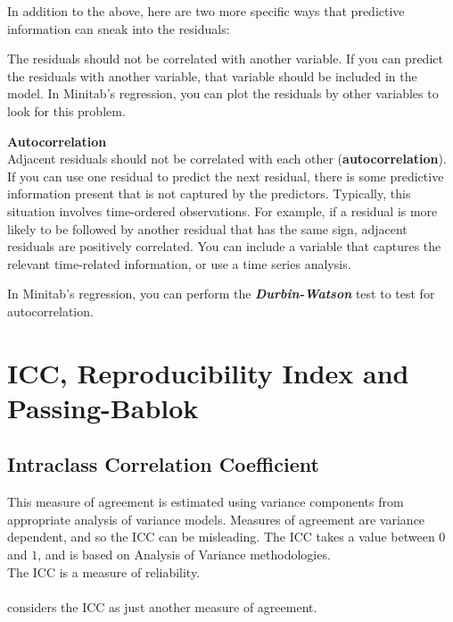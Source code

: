\documentclass[12pt, a4paper]{report}
\theoremstyle{plain}
\theoremstyle{definition}
\theoremstyle{remark}
\begin{document}
	In addition to the above, here are two more specific ways that predictive information can sneak into the residuals:
	
	The residuals should not be correlated with another variable. If you can predict the residuals with another variable, that variable should be included in the model. In Minitab’s regression, you can plot the residuals by other variables to look for this problem.
	
	\noindent \textbf{Autocorrelation} \\
	Adjacent residuals should not be correlated with each other (\textbf{autocorrelation}). If you can use one residual to predict the next residual, there is some predictive information present that is not captured by the predictors. Typically, this situation involves time-ordered observations. For example, if a residual is more likely to be followed by another residual that has the same sign, adjacent residuals are positively correlated. You can include a variable that captures the relevant time-related information, or use a time series analysis. 
	
	In Minitab’s regression, you can perform the \textbf{\textit{Durbin-Watson} }test to test for autocorrelation.
	\newpage

	\section{ICC, Reproducibility Index and Passing-Bablok }
	
	
	\subsection{Intraclass Correlation Coefficient} This measure of agreement is estimated using variance components from appropriate analysis of variance models. Measures of agreement are variance dependent, and so the ICC can be misleading. The ICC takes a value between $0$ and $1$, and is based on Analysis of Variance
	methodologies.
	\\
	The ICC is a measure of reliability.
	\\
	\\\citet{bartko} considers the ICC as just another measure of agreement.
	
	
\end{document}
